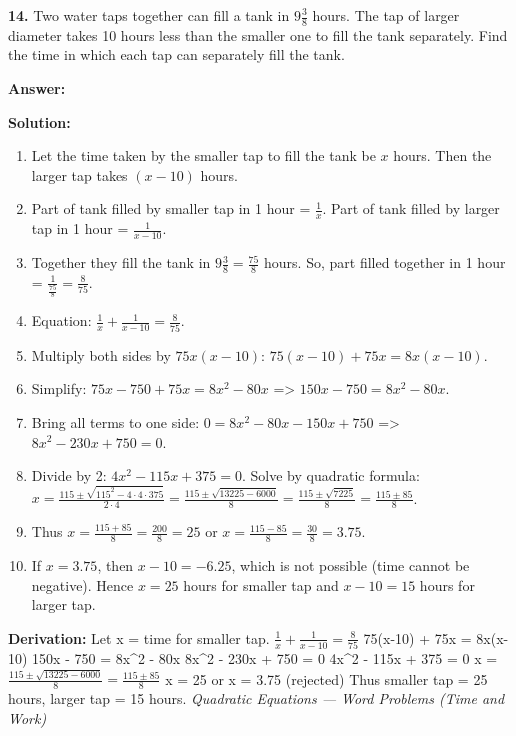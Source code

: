 \documentclass[12pt,a4paper]{exam}
\newcommand{\fitmath}[1]{%
  \sbox{\schmathbox}{$\displaystyle #1$}%
  \ifdim\wd\schmathbox>\linewidth
    \resizebox{\linewidth}{!}{\usebox{\schmathbox}}%
  \else
    \usebox{\schmathbox}%
  \fi}
\begin{document}
\begin{questions}
\question \textbf{14.} Two water taps together can fill a tank in $9\frac{3}{8}$ hours. The tap of larger diameter takes 10 hours less than the smaller one to fill the tank separately. Find the time in which each tap can separately fill the tank.

\textbf{Answer:}
\begin{center}
\fitmath{\text{Larger tap}: 15 \text{hours}, \text{Smaller tap}: 25 \text{hours}}
\end{center}

\textbf{Solution:}
\begin{enumerate}
  \item Let the time taken by the smaller tap to fill the tank be $x$ hours. Then the larger tap takes $(x - 10)$ hours.
  \item Part of tank filled by smaller tap in 1 hour = $\frac{1}{x}$. Part of tank filled by larger tap in 1 hour = $\frac{1}{x - 10}$.
  \item Together they fill the tank in $9\frac{3}{8} = \frac{75}{8}$ hours. So, part filled together in 1 hour = $\frac{1}{\frac{75}{8}} = \frac{8}{75}$.
  \item Equation: $\frac{1}{x} + \frac{1}{x - 10} = \frac{8}{75}$.
  \item Multiply both sides by $75x(x - 10)$: $75(x - 10) + 75x = 8x(x - 10)$.
  \item Simplify: $75x - 750 + 75x = 8x^2 - 80x$ => $150x - 750 = 8x^2 - 80x$.
  \item Bring all terms to one side: $0 = 8x^2 - 80x - 150x + 750$ => $8x^2 - 230x + 750 = 0$.
  \item Divide by 2: $4x^2 - 115x + 375 = 0$. Solve by quadratic formula: $x = \frac{115 \pm \sqrt{115^2 - 4 \cdot 4 \cdot 375}}{2 \cdot 4} = \frac{115 \pm \sqrt{13225 - 6000}}{8} = \frac{115 \pm \sqrt{7225}}{8} = \frac{115 \pm 85}{8}$.
  \item Thus $x = \frac{115 + 85}{8} = \frac{200}{8} = 25$ or $x = \frac{115 - 85}{8} = \frac{30}{8} = 3.75$.
  \item If $x = 3.75$, then $x - 10 = -6.25$, which is not possible (time cannot be negative). Hence $x = 25$ hours for smaller tap and $x - 10 = 15$ hours for larger tap.
\end{enumerate}
\textbf{Derivation:}
Let  x  = time for smaller tap.
 $\frac{1}{x} + \frac{1}{x-10} = \frac{8}{75}$ 
 75(x-10) + 75x = 8x(x-10) 
 150x - 750 = 8x\textasciicircum{}2 - 80x 
 8x\textasciicircum{}2 - 230x + 750 = 0 
 4x\textasciicircum{}2 - 115x + 375 = 0 
 x = $\frac{115 \pm \sqrt{13225 - 6000}}{8} = \frac{115 \pm 85}{8}$ 
 x = 25  or  x = 3.75  (rejected)
Thus smaller tap = 25 hours, larger tap = 15 hours.
\hfill \textit{Quadratic Equations — Word Problems (Time and Work)}
\vspace{0.3cm}


\end{questions}
\end{document}
